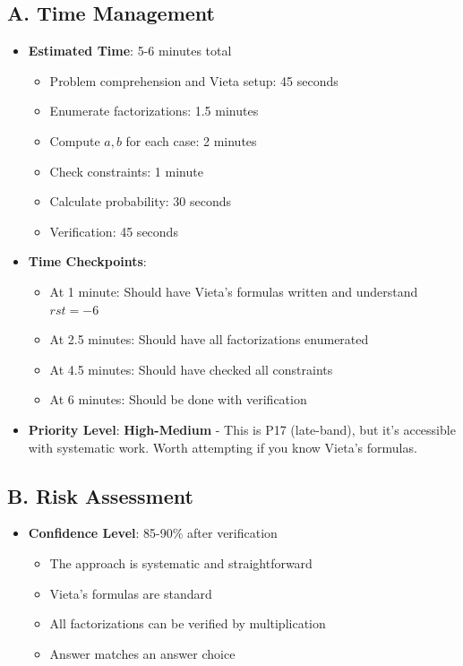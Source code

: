 \documentclass[12pt]{article}
\begin{document}
\begin{competitionbox}
\subsection*{A. Time Management}
\begin{itemize}[leftmargin=*]
    \item \textbf{Estimated Time}: 5-6 minutes total
    \begin{itemize}
        \item Problem comprehension and Vieta setup: 45 seconds
        \item Enumerate factorizations: 1.5 minutes
        \item Compute $a, b$ for each case: 2 minutes
        \item Check constraints: 1 minute
        \item Calculate probability: 30 seconds
        \item Verification: 45 seconds
    \end{itemize}
    
    \item \textbf{Time Checkpoints}: 
    \begin{itemize}
        \item At 1 minute: Should have Vieta's formulas written and understand $rst = -6$
        \item At 2.5 minutes: Should have all factorizations enumerated
        \item At 4.5 minutes: Should have checked all constraints
        \item At 6 minutes: Should be done with verification
    \end{itemize}
    
    \item \textbf{Priority Level}: \textbf{High-Medium} - This is P17 (late-band), but it's accessible with systematic work. Worth attempting if you know Vieta's formulas.
\end{itemize}

\subsection*{B. Risk Assessment}
\begin{itemize}[leftmargin=*]
    \item \textbf{Confidence Level}: 85-90\% after verification
    \begin{itemize}
        \item The approach is systematic and straightforward
        \item Vieta's formulas are standard
        \item All factorizations can be verified by multiplication
        \item Answer matches an answer choice
    \end{itemize}
    

\end{itemize}
\end{competitionbox}
\end{document}
